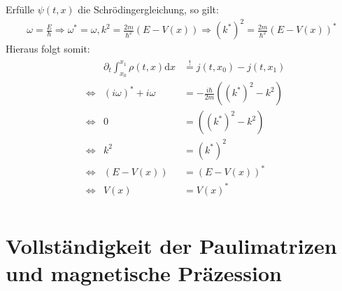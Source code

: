 \documentclass[a4paper,11pt]{article}
\begin{document}
Erfülle $\psi(t, x)$ die Schrödingergleichung, so gilt:
\begin{align}
        \omega = \frac{E}{\hbar} \Rightarrow \omega^* = \omega, k^2 = \frac{2m}{\hbar^2}(E-V(x)) \Rightarrow (k^*)^2 = \frac{2m}{\hbar^2}(E-V(x))^*
\end{align}
Hieraus folgt somit:
\begin{align}
        \begin{split}
                &                 & \partial_t \int_{x_0}^{x_1} \rho(t, x)\text{d}x & \overset{!}{=} j(t, x_0) - j(t, x_1) \\
                & \Leftrightarrow & (i\omega)^* + i\omega                           & = -\frac{i\hbar}{2m}((k^*)^2 - k^2) \\
                & \Leftrightarrow & 0                                               & = ((k^*)^2 - k^2) \\
                & \Leftrightarrow & k^2                                             & = (k^*)^2 \\
                & \Leftrightarrow & (E-V(x))                                        & = (E-V(x))^* \\
                & \Leftrightarrow & V(x)                                            & = V(x)^* \\
        \end{split}
\end{align}

\section{Vollständigkeit der Paulimatrizen und magnetische Präzession}
\end{document}
